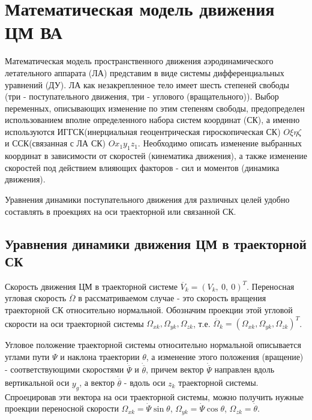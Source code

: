\section{Математическая модель движения ЦМ ВА}

Математическая модель пространственного движения аэродинамического летательного аппарата (ЛА) представим в виде системы дифференциальных уравнений (ДУ). ЛА как незакрепленное тело имеет шесть степеней свободы (три - поступательного движения, три - углового (вращательного)). Выбор переменных, описывающих изменение по этим степеням свободы, предопределен использованием вполне определенного набора систем координат (СК), а именно используются ИГГСК(инерциальная геоцентрическая гироскопическая СК) $O\xi \eta \zeta$ и ССК(связанная с ЛА СК) $O x_1 y_1 z_1$. Необходимо описать изменение выбранных координат в зависимости от скоростей (кинематика движения), а также изменение скоростей под действием влияющих факторов - сил и моментов (динамика движения).

Уравнения динамики поступательного движения для различных целей удобно составлять в проекциях на оси траекторной или связанной СК.

\clearpage

\subsection{Уравнения динамики движения ЦМ в траекторной СК}
Скорость движения ЦМ в траекторной системе $\overline{V}_k = (V_k, \  0, \  0)^T$. Переносная угловая скорость $\overline{\Omega}$ в рассматриваемом случае - это скорость вращения траекторной СК относительно нормальной. Обозначим проекции этой угловой скорости на оси траекторной системы $\Omega_{xk}, \Omega_{yk}, \Omega_{zk}$, т.е. $\overline{\Omega}_k = (\Omega_{xk}, \Omega_{yk}, \Omega_{zk})^T$.

Угловое положение траекторной системы относительно нормальной описывается углами пути $\Psi$ и наклона траектории $\theta$, а изменение этого положения (вращение) - соответствующими скоростями $\Dot{\overline{\Psi}}$ и $\Dot{\overline{\theta}}$, причем вектор $\Dot{\overline{\Psi}}$ направлен вдоль вертикальной оси $y_g$, а вектор $\Dot{\overline{\theta}}$ - вдоль оси $z_k$ траекторной системы. Спроецировав эти вектора на оси траекторной системы, можно  получить нужные проекции переносной скорости $\Omega_{xk} = \Dot{\Psi} \sin{\theta}$, $\Omega_{yk} = \Dot{\Psi} \cos{\theta}$, $\Omega_{zk} =\Dot{\theta}$.

